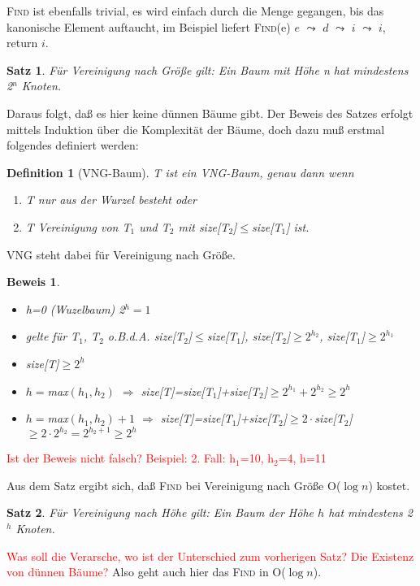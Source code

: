 \documentclass[ngerman,draft,parskip=half*,twoside]{scrreprt}
\theoremstyle{break}
\newtheorem{beweis}{Beweis}
\newtheorem{definition}{Definition}
\newtheorem{satz}{Satz}
\begin{document}
\textsc{Find} ist ebenfalls trivial, es wird einfach durch die Menge gegangen, bis das kanonische Element auftaucht, im
Beispiel liefert \textsc{Find}(e) $e$ $\leadsto$ $d$ $\leadsto$ $i$ $\leadsto$ $i$, return $i$.

\begin{satz}
Für Vereinigung nach Größe gilt: Ein Baum mit Höhe n hat mindestens 2$^n$ Knoten. 
\end{satz}
Daraus folgt, daß es hier keine dünnen Bäume gibt. Der Beweis des Satzes erfolgt mittels Induktion über die
Komplexität der Bäume, doch dazu muß erstmal folgendes definiert werden:
 
\begin{definition}[VNG-Baum]
T ist ein VNG-Baum, genau dann wenn
\begin{enumerate}
\item T nur aus der Wurzel besteht oder
\item T Vereinigung von T$_1$ und T$_2$ mit size[T$_2$]$\leq$size[T$_1$] ist.
\end{enumerate}
\end{definition}
VNG steht dabei für Vereinigung nach Größe.

\begin{beweis}
\begin{itemize}
\item[I.A.] h=0 (Wuzelbaum) 2$^h=1$
\item[I.V.] gelte für T$_1$, T$_2$ o.B.d.A. size[T$_2$]$\leq$size[T$_1$], size[T$_2$]$\geq 2^{h_2}$, size[T$_1$]$\geq
2^{h_1}$
\item[I.B.] size[T]$\geq 2^h$
\item[1. Fall] $h=$max$(h_1, h_2)$ $\Rightarrow$ size[T]=size[T$_1$]+size[T$_2$]$\geq 2^{h_1}+2^{h_2} \geq 2^h$
\item[2. Fall] $h=$max$(h_1, h_2)+1$ $\Rightarrow$ size[T]=size[T$_1$]+size[T$_2$]$\geq 2 \cdot $size[T$_2$]$\geq 2
\cdot 2^{h_2} =2^{h_2+1} \geq 2^h$
\end{itemize}
\end{beweis}

\textcolor{red}{Ist der Beweis nicht falsch? Beispiel: 2. Fall: h$_1$=10, h$_2$=4, h=11}

Aus dem Satz ergibt sich, daß \textsc{Find} bei Vereinigung nach Größe O($\log n$) kostet.

\begin{satz}
Für Vereinigung nach Höhe gilt: Ein Baum der Höhe $h$ hat mindestens 2$^h$ Knoten.
\end{satz}
\textcolor{red}{Was soll die Verarsche, wo ist der Unterschied zum vorherigen Satz? Die Existenz von dünnen Bäume?}
Also geht auch hier das \textsc{Find} in O($\log n$).
\end{document}
